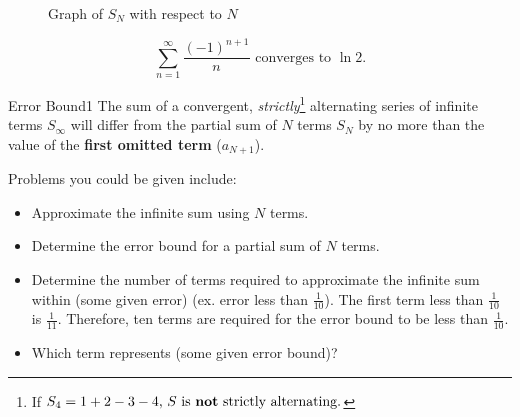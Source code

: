 \documentclass{article}
\theoremstyle{definition}
\begin{document}
\begin{figure}[h]
\centering


\caption{Graph of $S_N$ with respect to $N$}
\end{figure}

\[\sum_{n=1}^{\infty} \frac{(-1)^{n+1}}{n} \text{ converges to } \ln 2.\]

\vspace{0.5cm}

\begin{theorem}{Error Bound}{1}
The sum of a convergent, \emph{strictly}\footnote[1]{If $S_4=1+2-3-4 \text{, $S$ is \textbf{not} strictly alternating.}$} alternating series of infinite terms $S_\infty$ will differ from the partial sum of $N$ terms $S_N$ by no more than the value of the \textbf{first omitted term} ($a_{N+1}$).
\end{theorem}

\vspace{0.5cm}

Problems you could be given include:
\begin{itemize}
    \item Approximate the infinite sum using $N$ terms.
    \item Determine the error bound for a partial sum of $N$ terms.
    \item Determine the number of terms required to approximate the infinite sum within (some given error) (ex. error less than $\frac{1}{10}$). The first term less than $\frac{1}{10}$ is $\frac{1}{11}$. 
    \vspace{0.1cm}
    Therefore, ten terms are required for the error bound to be less than $\frac{1}{10}$.
    \item Which term represents (some given error bound)?
\end{itemize}
\end{document}
